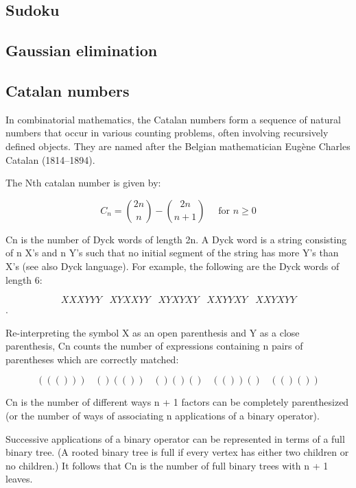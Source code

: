 \documentclass[10pt,letterpaper,twocolumn,twosided]{article}
\newcommand{\codigofuente}[1]{

\dotfill
}
\begin{document}
\subsection{Sudoku}

\codigofuente{src/misc/sudoku.cpp}

\codigofuente{src/misc/sudokuE.cpp}

\subsection{Gaussian elimination}

\codigofuente{src/misc/gaussian.cpp}

\subsection{Catalan numbers}

In combinatorial mathematics, the Catalan numbers form a sequence of natural numbers that occur in various counting problems, often involving recursively defined objects. They are named after the Belgian mathematician Eugène Charles Catalan (1814–1894).

The Nth catalan number is given by:

$$C_n = {2n\choose n} - {2n\choose n+1} \quad\text{ for }n\ge 0$$

Cn is the number of Dyck words of length 2n. A Dyck word is a string consisting of n X's and n Y's such that no initial segment of the string has more Y's than X's (see also Dyck language). For example, the following are the Dyck words of length 6:

$$XXXYYY \;\;\;   XYXXYY  \;\;\;  XYXYXY  \;\;\;  XXYYXY   \;\;\;  XXYXYY$$.

Re-interpreting the symbol X as an open parenthesis and Y as a close parenthesis, Cn counts the number of expressions containing n pairs of parentheses which are correctly matched:

$$((()))   \;\;\;  ()(())    \;\;\; ()()()   \;\;\;  (())()   \;\;\;  (()())$$

Cn is the number of different ways n + 1 factors can be completely parenthesized (or the number of ways of associating n applications of a binary operator).

Successive applications of a binary operator can be represented in terms of a full binary tree. (A rooted binary tree is full if every vertex has either two children or no children.) It follows that Cn is the number of full binary trees with n + 1 leaves.
\end{document}
